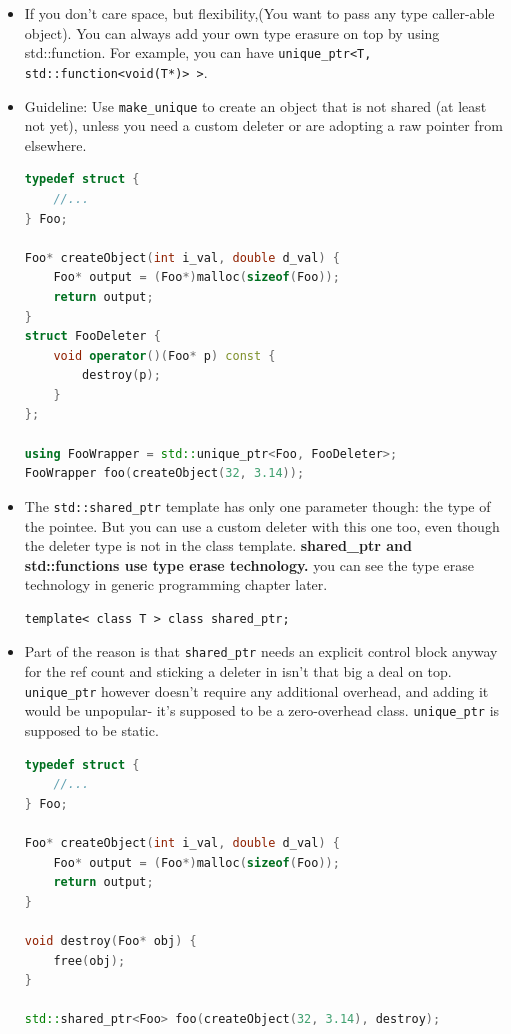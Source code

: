 \documentclass[a4paper,11pt,twoside]{book}
\begin{document}
\begin{itemize}
	
	\item If you don't care space, but flexibility,(You want to pass any type caller-able object).  You can always add your own type erasure on top by using std::function. For example, you can have \texttt{unique\_ptr<T, std::function<void(T*)> >}.
	
	\item Guideline: Use \texttt{make\_unique} to create an object that is not shared (at least not yet), unless you need a custom deleter or are adopting a raw pointer from elsewhere.
	
\begin{lstlisting}[frame=single, language=c++]
typedef struct {
	//...
} Foo;

Foo* createObject(int i_val, double d_val) {
	Foo* output = (Foo*)malloc(sizeof(Foo));
	return output;
}
struct FooDeleter {
	void operator()(Foo* p) const {
		destroy(p);
	}
};
	
using FooWrapper = std::unique_ptr<Foo, FooDeleter>;
FooWrapper foo(createObject(32, 3.14));
\end{lstlisting}

	\item The \texttt{std::shared\_ptr} template has only one parameter though: the type of the pointee. But you can use a custom deleter with this one too, even though the deleter type is not in the class template. \textbf{shared\_ptr and std::functions use type erase technology.} you can see the type erase technology in generic programming chapter later.
\begin{lstlisting}
template< class T > class shared_ptr;
\end{lstlisting}
	
	\item Part of the reason is that \texttt{shared\_ptr} needs an explicit control block anyway for the ref count and sticking a deleter in isn't that big a deal on top. \texttt{unique\_ptr} however doesn't require any additional overhead, and adding it would be unpopular- it's supposed to be a zero-overhead class. \texttt{unique\_ptr} is supposed to be static. 
\begin{lstlisting}[frame=single, language=c++]
typedef struct {
	//...
} Foo;

Foo* createObject(int i_val, double d_val) {
	Foo* output = (Foo*)malloc(sizeof(Foo));
	return output;
}

void destroy(Foo* obj) {
	free(obj);
}

std::shared_ptr<Foo> foo(createObject(32, 3.14), destroy);
\end{lstlisting}
\end{itemize}
\end{document}

